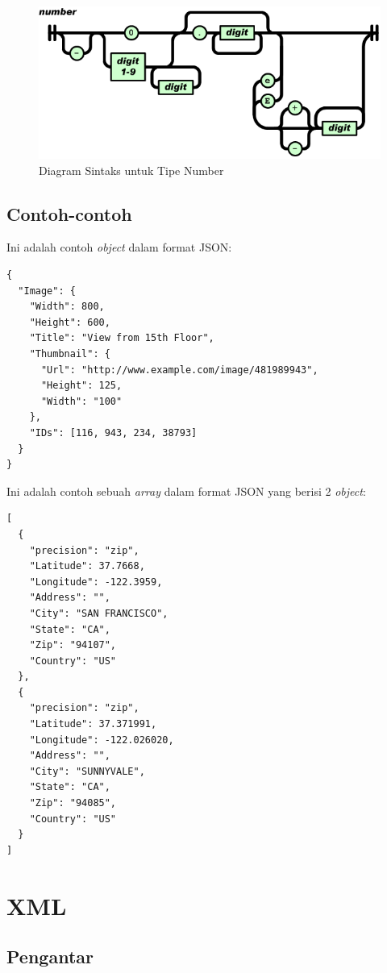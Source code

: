 \documentclass[a4paper, 12pt]{report}
\begin{document}
\begin{figure}[htp]
\centering
\includegraphics[scale=0.55]{images/number-json.png}
\caption{Diagram Sintaks untuk Tipe Number\cite{json-fat-free}}
\label{Diagram Sintaks untuk Tipe Number}
\end{figure}

\newpage
\subsection{Contoh-contoh}
\onehalfspacing Ini adalah contoh \textit{object} dalam format JSON:

\begin{lstlisting}[frame=single]
{
  "Image": {
    "Width": 800,
    "Height": 600,
    "Title": "View from 15th Floor",
    "Thumbnail": {
      "Url": "http://www.example.com/image/481989943",
      "Height": 125,
      "Width": "100"
    },
    "IDs": [116, 943, 234, 38793]
  }
}
\end{lstlisting}

\onehalfspacing Ini adalah contoh sebuah \textit{array} dalam format JSON yang berisi 2 \textit{object}:

\begin{lstlisting}[frame=single]
[
  {
    "precision": "zip",
    "Latitude": 37.7668,
    "Longitude": -122.3959,
    "Address": "",
    "City": "SAN FRANCISCO",
    "State": "CA",
    "Zip": "94107",
    "Country": "US"
  },
  {
    "precision": "zip",
    "Latitude": 37.371991,
    "Longitude": -122.026020,
    "Address": "",
    "City": "SUNNYVALE",
    "State": "CA",
    "Zip": "94085",
    "Country": "US"
  }
]
\end{lstlisting}

\section{XML}

\subsection{Pengantar}
\end{document}
